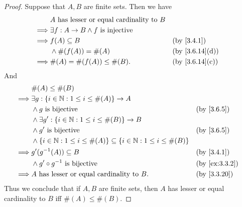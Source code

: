 \begin{proof}
  Suppose that \(A, B\) are finite sets.
  Then we have
  \begin{align*}
             & A \text{ has lesser or equal cardinality to } B                                    \\
    \implies & \exists f : A \to B \land f \text{ is injective}                                   \\
    \implies & f(A) \subseteq B                                 &  & \by{3.4.1}                   \\
             & \land \#(f(A)) = \#(A)                           &  & \text{(by \cref{3.6.14}(d))} \\
    \implies & \#(A) = \#(f(A)) \leq \#(B).                     &  & \text{(by \cref{3.6.14}(c))}
  \end{align*}
  And
  \begin{align*}
             & \#(A) \leq \#(B)                                                                                         \\
    \implies & \exists g : \{i \in \N : 1 \leq i \leq \#(A)\} \to A                                                     \\
             & \land g \text{ is bijective}                                                          &  & \by{3.6.5}    \\
             & \land \exists g' : \{i \in \N : 1 \leq i \leq \#(B)\} \to B                                              \\
             & \land g' \text{ is bijective}                                                         &  & \by{3.6.5}    \\
             & \land \{i \in \N : 1 \leq i \leq \#(A)\} \subseteq \{i \in \N : 1 \leq i \leq \#(B)\}                    \\
    \implies & g'(g^{-1}(A)) \subseteq B                                                             &  & \by{3.4.1}    \\
             & \land g' \circ g^{-1} \text{ is bijective}                                            &  & \by{ex:3.3.2} \\
    \implies & A \text{ has lesser or equal cardinality to } B.                                      &  & \by{3.3.20}
  \end{align*}
  Thus we conclude that if \(A, B\) are finite sets, then \(A\) has lesser or equal cardinality to \(B\) iff \(\#(A) \leq \#(B)\).
\end{proof}

